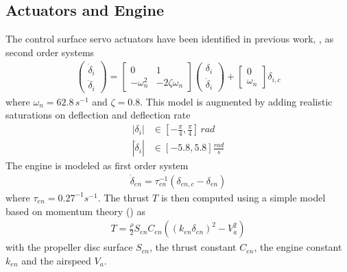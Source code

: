 \documentclass{ifacconf}
\begin{document}
\subsection{Actuators and Engine}
The control surface servo actuators have been identified in previous work, \cite{ameho2013pilotage}, as second order systems 
\begin{align}
\begin{pmatrix}
\dot{\delta}_i \\
\ddot{\delta}_i
\end{pmatrix}
=
\begin{bmatrix}
0 & 1 \\
-\omega_n^2 & -2 \zeta \omega_n 
\end{bmatrix}
\begin{pmatrix}
\delta_i \\
\dot{\delta}_i
\end{pmatrix}
+
\begin{bmatrix}
0\\
\omega_n
\end{bmatrix}
\delta_{i, c}
\end{align}
where $\omega_n=62.8 \, s^{-1}$ and $\zeta=0.8$.
This model is augmented by adding realistic saturations on deflection and deflection rate
%
\begin{align}
|\delta_i| &\in [-\frac{\pi}{4}, \frac{\pi}{4}]\, rad\\
|\dot{\delta}_i| &\in [-5.8, 5.8] \frac{rad}{s}
\end{align}
The engine is modeled as first order system
%
\begin{align}
\dot{\delta}_{en}
=
\tau_{en}^{-1}
(
\delta_{en, c}
- \delta_{en}
)
\end{align}
%
where $\tau_{en} = 0.27^{-1}s^{-1}$. The thrust $T$ is then computed using a simple model based on momentum theory (\cite{Beard2012}) as
%
\begin{align}
T = \frac{\rho}{2}
S_{en}
C_{en} 
(
(k_{en}\delta_{en})^2
-V_a^2
)
\end{align}
with the propeller disc surface $S_{en}$, the thrust constant $C_{en}$, the engine constant $k_{en}$ and the airspeed $V_a$.
%
%
\end{document}
